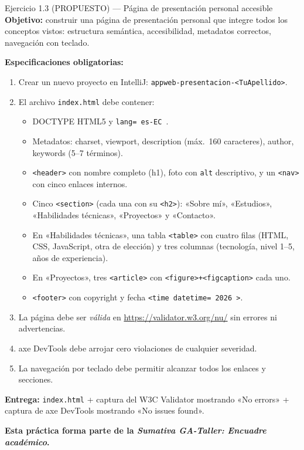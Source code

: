 \begin{cajaejercicio}{Ejercicio 1.3 (PROPUESTO) --- Página de presentación personal accesible}
\textbf{Objetivo:} construir una página de presentación personal que
integre todos los conceptos vistos: estructura semántica,
accesibilidad, metadatos correctos, navegación con teclado.

\textbf{Especificaciones obligatorias:}
\begin{enumerate}
\item Crear un nuevo proyecto en IntelliJ:
\texttt{appweb-presentacion-<TuApellido>}.
\item El archivo \texttt{index.html} debe contener:
   \begin{itemize}
   \item DOCTYPE HTML5 y \texttt{lang= es-EC }.
   \item Metadatos: charset, viewport, description (máx.\ 160
   caracteres), author, keywords (5--7 términos).
   \item \texttt{<header>} con nombre completo (h1), foto con
   \texttt{alt} descriptivo, y un \texttt{<nav>} con cinco enlaces
   internos.
   \item Cinco \texttt{<section>} (cada una con su \texttt{<h2>}):
   «Sobre mí», «Estudios», «Habilidades técnicas», «Proyectos» y
   «Contacto».
   \item En «Habilidades técnicas», una tabla \texttt{<table>}
   con cuatro filas (HTML, CSS, JavaScript, otra de elección) y
   tres columnas (tecnología, nivel 1--5, años de experiencia).
   \item En «Proyectos», tres \texttt{<article>} con
   \texttt{<figure>+<figcaption>} cada uno.
   \item \texttt{<footer>} con copyright y fecha
   \texttt{<time datetime= 2026 >}.
   \end{itemize}
\item La página debe ser \emph{válida} en
\url{https://validator.w3.org/nu/} sin errores ni advertencias.
\item axe DevTools debe arrojar cero violaciones de cualquier
severidad.
\item La navegación por teclado debe permitir alcanzar todos los
enlaces y secciones.
\end{enumerate}

\textbf{Entrega:} \texttt{index.html} + captura del W3C Validator
mostrando «No errors» + captura de axe DevTools mostrando «No issues
found».

\textbf{Esta práctica forma parte de la \emph{Sumativa GA-Taller:
Encuadre académico}.}
\end{cajaejercicio}

